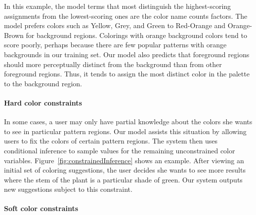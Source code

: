 In this example, the model terms that most distinguish the highest-scoring assignments from the lowest-scoring ones are the color name counts factors. The model prefers colors such as Yellow, Grey, and Green to Red-Orange and Orange-Brown for background regions. Colorings with orange background colors tend to score poorly, perhaps because there are few popular patterns with orange backgrounds in our training set.
Our model also predicts that foreground regions should more perceptually distinct from the background than from other foreground regions. Thus, it tends to assign the most distinct color in the palette to the background region.


\paragraph{Hard color constraints}

In some cases, a user may only have partial knowledge about the colors she wants to see in particular pattern regions. Our model assists this situation by allowing users to fix the colors of certain pattern regions. The system then uses conditional inference to sample values for the remaining unconstrained color variables. Figure~\ref{fig:constrainedInference} shows an example. After viewing an initial set of coloring suggestions, the user decides she wants to see more results where the stem of the plant is a particular shade of green. Our system outputs new suggestions subject to this constraint.

\paragraph{Soft color constraints}

